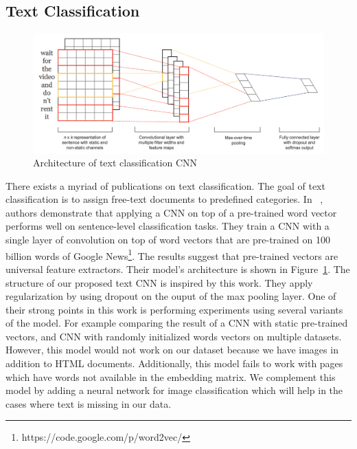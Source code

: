 \documentclass{article} %
\begin{document}
\subsection{Text Classification}
\begin{figure}
\centering
        \includegraphics[totalheight=3cm]{textnet}
    \caption{Architecture of text classification CNN \protect\cite{convtext}}
    \label{fig:textnet}
\end{figure}
There exists a myriad of publications on text classification. The goal of text classification is to assign free-text documents to predefined categories. In ~\cite{convtext}, authors demonstrate that applying a CNN on top of a pre-trained word vector performs well on sentence-level classification tasks. They train a CNN with a single layer of convolution on top of word vectors that are pre-trained on 100 billion words of Google News\footnote{https://code.google.com/p/word2vec/}. The results suggest that pre-trained vectors are universal feature extractors. Their model's architecture is shown in Figure~\ref{fig:textnet}. The structure of our proposed text CNN is inspired by this work. They apply regularization by using dropout on the ouput of the max pooling layer. One of their strong points in this work is performing experiments using several variants of the model. For example comparing the result of a CNN with static pre-trained vectors, and CNN with randomly initialized words vectors on multiple datasets. However, this model would not work on our dataset because we have images in addition to HTML documents. Additionally, this model fails to work with pages which have words not available in the embedding matrix. We complement this model by adding a neural network for image classification which will help in the cases where text is missing in our data.
\end{document}
